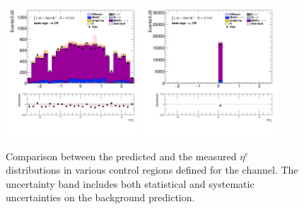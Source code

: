 \begin{figure}[!htp]
\begin{center}
			\includegraphics[width=0.45\textwidth]{chapters/chapter6_HPlus/images/taulep/el_0_eta_SS_TAUEL.png} 
			\includegraphics[width=0.45\textwidth]{chapters/chapter6_HPlus/images/taulep/el_0_eta_SS_TAUMU.png} \\
			\end{center}
			\caption{
			Comparison between the predicted and the measured $\eta^{e}$ distributions in various control regions defined for the \taulep channel. The uncertainty band includes both statistical and systematic uncertainties on the background prediction. 
			}
			\label{fig:bkg-eta-el-taulep}
		\end{figure}

